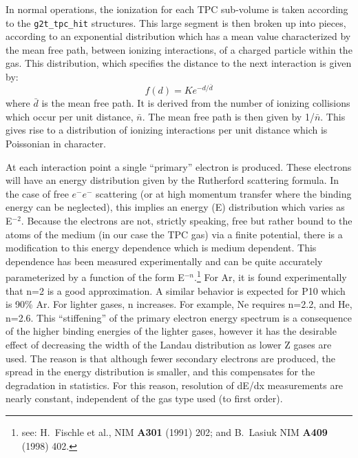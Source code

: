 \documentclass{article}
\begin{document}
In normal operations, the ionization for each TPC sub-volume 
is taken according to the \texttt{g2t\_tpc\_hit} structures.  
This large segment is then broken up into pieces, according 
to an exponential distribution which has a mean value characterized
by the mean free path, between ionizing interactions, of a charged
particle within the gas.  This distribution, which specifies the
distance to the next interaction is given by:
\begin{equation}
        f(d) = K e^{-d/\bar{d}}
\label{eq:meanFreePath}
\end{equation}
where $\bar{d}$ is the mean free path.  It is derived from
the number of ionizing collisions which occur per unit
distance, $\bar{n}$.  The mean free path is then given by 1/$\bar{n}$.  
This gives rise to a distribution of ionizing interactions per
unit distance which is Poissonian in character.

At each interaction point a single ``primary'' electron is produced.  
These electrons will have an energy distribution given by 
the Rutherford scattering formula.  In the case of free $e^{-}e^{-}$ 
scattering (or at high momentum transfer where the binding energy
can be neglected), this implies an energy (E) distribution which
varies as E$^{-2}$.  Because the electrons are not, strictly speaking,
free  but rather bound to the atoms of the medium (in our case the TPC gas)
via a finite potential, there is a modification to this energy dependence
which is medium dependent.  This dependence has been measured experimentally
and can be quite accurately parameterized by a function of the
form E$^{-n}$.\footnote{see: H.~Fischle et al., NIM {\bf A301} (1991) 202;
  and B.~Lasiuk NIM {\bf A409} (1998) 402.}
For Ar, it is found experimentally that  
n=2 is a good approximation.  A similar behavior is expected for P10
which is 90\% Ar.  For lighter gases, n increases.  For
example, Ne requires n=2.2, and He, n=2.6.  This ``stiffening'' of the
primary electron energy spectrum is a consequence of the higher
binding energies of the lighter gases, however it has the desirable
effect of decreasing the width of the Landau distribution as
lower Z gases are used.  The reason is that although fewer secondary
electrons are produced, the spread in the energy distribution is smaller,
and this compensates for the degradation in statistics.
For this reason, resolution of dE/dx
measurements are nearly constant, independent of the gas
type used (to first order).
    
\end{document}
